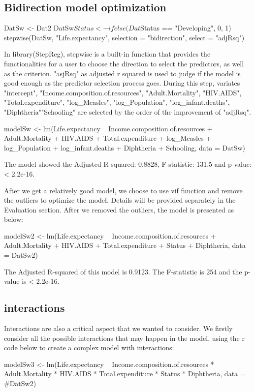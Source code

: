 \subsection{Bidirection model optimization}

DatSw <- Dat2
DatSw$Status <- ifelse(Dat$Status == "Developing", 0, 1)
stepwise(DatSw, "Life.expectancy", selection = "bidirection", select = "adjRsq")

In library(StepReg), stepwise is a built-in function that provides the functionalities for a user to choose the direction to select the predictors, as well as the criterion. "asjRsq" as adjusted r squared is used to judge if the model is good enough as the predictor selection process goes. During this step, variates "intercept", "Income.composition.of.resources", "Adult.Mortality", "HIV.AIDS", "Total.expenditure", "log_Measles", "log_Population", "log_infant.deaths", "Diphtheria""Schooling" are selected by the order of the improvement of "adjRsq".

modelSw <- lm(Life.expectancy ~ Income.composition.of.resources + Adult.Mortality + HIV.AIDS + Total.expenditure + log_Measles + log_Population + log_infant.deaths + Diphtheria + Schooling, data = DatSw)

The model showed the Adjusted R-squared:  0.8828, F-statistic: 131.5 and p-value: < 2.2e-16.

After we get a relatively good model, we choose to use vif function and remove the outliers to optimize the model. Details will be provided separately in the Evaluation section. After we removed the outliers, the model is presented as below:

modelSw2 <- lm(Life.expectancy ~ Income.composition.of.resources + Adult.Mortality + HIV.AIDS + Total.expenditure + Status + Diphtheria, data = DatSw2)

The Adjusted R-squared of this model is 0.9123. The F-statistic is 254 and the p-value is < 2.2e-16. 

\subsection{interactions}

Interactions are also a critical aspect that we wanted to consider. We firstly consider all the possible interactions that may happen in the model, using the r code below to create a complex model with interactions:

modelSw3 <- lm(Life.expectancy ~ Income.composition.of.resources * Adult.Mortality * HIV.AIDS * Total.expenditure * Status * Diphtheria, data = #DatSw2)


